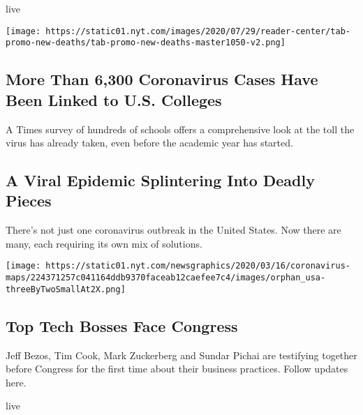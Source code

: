 live

\texttt{[image: https://static01.nyt.com/images/2020/07/29/reader-center/tab-promo-new-deaths/tab-promo-new-deaths-master1050-v2.png]}

\href{/interactive/2020/07/28/us/covid-19-colleges-universities.html}{}

\hypertarget{more-than-6300-coronavirus-cases-have-been-linked-to-us-colleges}{%
\subsection{More Than 6,300 Coronavirus Cases Have Been Linked to U.S.
Colleges}\label{more-than-6300-coronavirus-cases-have-been-linked-to-us-colleges}}

A Times survey of hundreds of schools offers a comprehensive look at the
toll the virus has already taken, even before the academic year has
started.

\href{/2020/07/29/health/coronavirus-future-america.html}{}

\hypertarget{a-viral-epidemic-splintering-into-deadly-pieces}{%
\subsection{A Viral Epidemic Splintering Into Deadly
Pieces}\label{a-viral-epidemic-splintering-into-deadly-pieces}}

There's not just one coronavirus outbreak in the United States. Now
there are many, each requiring its own mix of solutions.

\texttt{[image: https://static01.nyt.com/newsgraphics/2020/03/16/coronavirus-maps/224371257c041164ddb9370faceab12caefee7c4/images/orphan\_usa-threeByTwoSmallAt2X.png]}

\href{https://www.nytimes.com/live/2020/07/29/technology/tech-ceos-hearing-testimony}{}

\hypertarget{top-tech-bosses-face-congress}{%
\subsection{Top Tech Bosses Face
Congress}\label{top-tech-bosses-face-congress}}

Jeff Bezos, Tim Cook, Mark Zuckerberg and Sundar Pichai are testifying
together before Congress for the first time about their business
practices. Follow updates here.

live

\href{/2020/07/27/business/jeff-bezos-amazon-congress.html}{}

